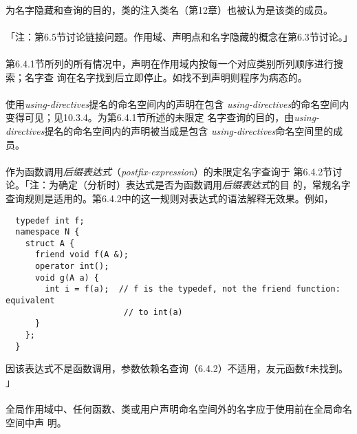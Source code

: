\paragraph{}
为名字隐藏和查询的目的，类的注入类名（第12章）也被认为是该类的成员。

\paragraph{}
「注：第6.5节讨论链接问题。作用域、声明点和名字隐藏的概念在第6.3节讨论。」

\paragraph{}
第6.4.1节所列的所有情况中，声明在作用域内按每一个对应类别所列顺序进行搜索；名字查
询在名字找到后立即停止。如找不到声明则程序为病态的。

\paragraph{}
使用\textit{using-directives}提名的命名空间内的声明在包含
\textit{using-directives}的命名空间内变得可见；见10.3.4。为第6.4.1节所述的未限定
名字查询的目的，由\textit{using-directives}提名的命名空间内的声明被当成是包含
\textit{using-directives}命名空间里的成员。

\paragraph{}
作为函数调用\textit{后缀表达式}（\textit{postfix-expression}）的未限定名字查询于
第6.4.2节讨论。「注：为确定（分析时）表达式是否为函数调用\textit{后缀表达式}的目
的，常规名字查询规则是适用的。第6.4.2中的这一规则对表达式的语法解释无效果。例如，
\begin{lstlisting}
  typedef int f;
  namespace N {
    struct A {
      friend void f(A &);
      operator int();
      void g(A a) {
        int i = f(a);  // f is the typedef, not the friend function: equivalent
                        // to int(a)
      }
    };
  }
\end{lstlisting}
因该表达式不是函数调用，参数依赖名查询（6.4.2）不适用，友元函数\texttt{f}未找到。
」

\paragraph{}
全局作用域中、任何函数、类或用户声明命名空间外的名字应于使用前在全局命名空间中声
明。

